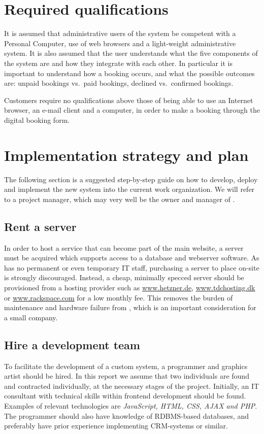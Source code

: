 \section{Required qualifications}
It is assumed that administrative users of the system  be competent with a Personal Computer, 
use of web browsers and a light-weight administrative system. It is also assumed that the
user understands what the five components of the system are and
how they integrate with each other. In particular it is important to understand
how a booking occurs, and what the possible outcomes are: unpaid bookings vs.\ 
paid bookings, declined vs.\ confirmed bookings.

Customers require no qualifications above those of being able to use an Internet
browser, an e-mail client and a computer, in order to make a booking through the 
digital booking form.

\newpage
\section{Implementation strategy and plan}
The following section is a suggested step-by-step guide on how to develop, 
deploy and implement the new system into the current work organization. We 
will refer to a project manager, which may very well be the owner and 
manager of \gomonkey{}.

\subsection{Rent a server}
In order to host a service that can become part of the main website, a server
must be acquired which supports access to a database and webserver software. As
\gomonkey{} has no permanent or even temporary IT staff, purchasing a server to
place on-site is strongly discouraged. Instead, a cheap, minimally specced server 
should be provisioned from a hosting provider such as \url{www.hetzner.de}, 
\url{www.tdchosting.dk} or \url{www.rackspace.com} for a low monthly fee. This
removes the burden of maintenance and hardware failure from \gomonkey{}, which
is an important consideration for a small company.

\subsection{Hire a development team}
To facilitate the development of a custom system, a programmer and graphics
artist should be hired. In this report we assume that two individuals are found
and contracted individually, at the necessary stages of the project. Initially,
an IT consultant with technical skills within frontend development should be
found. Examples of relevant technologies are \textit{JavaScript, HTML, CSS, AJAX
and PHP}. The programmer should also have knowledge of RDBMS-based databases,
and preferably have prior experience implementing CRM-systems or similar.

